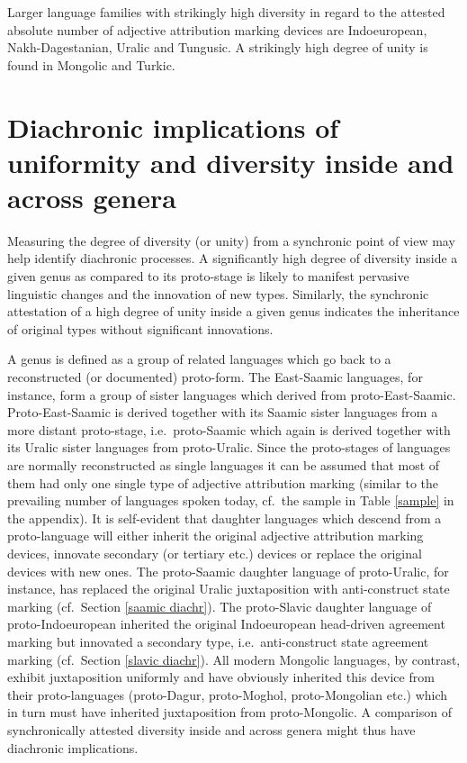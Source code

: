 Larger language families with strikingly high diversity in regard to the attested absolute number of adjective attribution marking devices are Indoeuropean, Nakh-Da\-ges\-tanian, Uralic and Tungusic. A strikingly high degree of unity is found in Mongolic and Turkic.

\section[Diachronic implications]{Diachronic implications of uniformity and diversity inside and across genera}
Measuring the degree of diversity (or unity) from a synchronic point of view may help identify diachronic processes. A significantly high degree of diversity inside a given genus as compared to its proto-stage is likely to manifest pervasive linguistic changes and the innovation of new types. Similarly, the synchronic attestation of a high degree of unity inside a given genus indicates the inheritance of original types without significant innovations. 

A genus is defined as a group of related languages which go back to a reconstructed (or documented) proto-form. The East-Saamic languages, for instance, form a group of sister languages which derived from proto-East-Saamic. Proto-East-Saamic is derived together with its Saamic sister languages from a more distant proto-stage, i.e.~proto-Saamic which again is derived together with its Uralic sister languages from proto-Uralic. Since the proto-stages of languages are normally reconstructed as single languages it can be assumed that most of them had only one single type of adjective attribution marking (similar to the prevailing number of languages spoken today, cf.~the sample in Table \ref{sample} in the appendix). It is self-evident that daughter languages which descend from a proto-language will either inherit the original adjective attribution marking devices, innovate secondary (or tertiary etc.) devices or replace the original devices with new ones. The proto-Saamic daughter language of proto-Uralic, for instance, has replaced the original Uralic juxtaposition with anti-construct state marking (cf.~Section \ref{saamic diachr}). The proto-Slavic daughter language of proto-Indoeuropean inherited the original Indoeuropean head-driven agreement marking but innovated a secondary type, i.e.~anti-construct state agreement marking (cf.~Section \ref{slavic diachr}). All modern Mongolic languages, by contrast, exhibit juxtaposition uniformly and have obviously inherited this device from their proto-languages (proto-Dagur, proto-Moghol, proto-Mongolian etc.) which in turn must have inherited juxtaposition from proto-Mongolic. A comparison of synchronically attested diversity inside and across genera might thus have diachronic implications.

